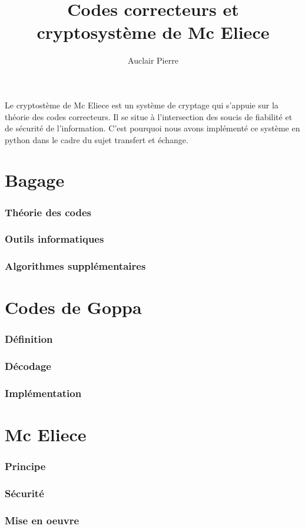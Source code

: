 \documentclass{article}
\title{Codes correcteurs et cryptosystème de Mc Eliece}
\author{Auclair Pierre}
\begin{document}
	\maketitle

	Le cryptostème de Mc Eliece est un système de cryptage qui s'appuie sur la théorie des codes correcteurs.
	Il se situe à l'intersection des soucis de fiabilité et de sécurité de l'information.
	C'est pourquoi nous avons implémenté ce système en python dans le cadre du sujet transfert et échange.


	\part*{Bagage}

		\section{Théorie des codes}

		\section{Outils informatiques}

		\section{Algorithmes supplémentaires}

	\part*{Codes de Goppa}

		\section{Définition}

		\section{Décodage}

		\section{Implémentation}
			

	\part*{Mc Eliece}

		\section{Principe}

		\section{Sécurité}

		\section{Mise en oeuvre}








\end{document}
